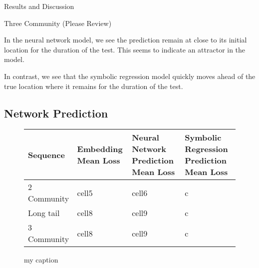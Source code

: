 \documentclass[12pt]{amsart}
\begin{document}
\begin{section}{Results and Discussion}
\begin{subsection}{Three Community (Please Review)}

        In the neural network model, we see the prediction remain at close to its initial location for the duration of the test. This seems to indicate an attractor in the model.

        In contrast, we see that the symbolic regression model quickly moves ahead of the true location where it remains for the duration of the test.


        \subsection{Network Prediction}
        \begin{figure}
            \begin{center}
                \begin{tabular}{| m{} | m{} | m{} | m{} |}
                 \hline
                 Sequence & Embedding Mean Loss & Neural Network Prediction Mean Loss & Symbolic Regression Prediction Mean Loss\\ 
                 \hline
                 \hline
                 2 Community & cell5 & cell6 & c\\ 
                 \hline 
                 Long tail & cell8 & cell9 & c \\ 
                 \hline 
                 3 Community & cell8 & cell9 & c \\ 
                 \hline 
                \end{tabular}
                \end{center}
                \caption{my caption}
        \end{figure}

\end{subsection}
\end{section}
\end{document}
